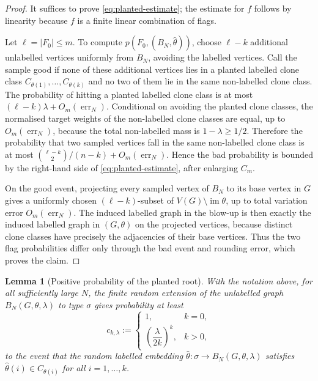 \documentclass[11pt]{article}
\newtheorem{lemma}[theorem]{Lemma}
\theoremstyle{definition}
\begin{document}
\begin{proof}
It suffices to prove \eqref{eq:planted-estimate}; the estimate for $f$ follows
by linearity because $f$ is a finite linear combination of flags.

Let $\ell=|F_0|\le m$.  To compute $p(F_0,(B_N,\widehat\theta))$, choose
$\ell-k$ additional unlabelled vertices uniformly from $B_N$, avoiding the
labelled vertices.  Call the sample good if none of these additional vertices
lies in a planted labelled clone class $C_{\theta(1)},\ldots,C_{\theta(k)}$ and
no two of them lie in the same non-labelled clone class.  The probability of
hitting a planted labelled clone class is at most
$(\ell-k)\lambda+O_m(\operatorname{err}_N)$.  Conditional on avoiding the planted clone classes, the normalised target weights
of the non-labelled clone classes are equal, up to $O_m(\operatorname{err}_N)$,
because the total non-labelled mass is $1-\lambda\ge1/2$.  Therefore the
probability that two sampled vertices
fall in the same non-labelled clone class is at most
$\binom{\ell-k}{2}/(n-k)+O_m(\operatorname{err}_N)$.  Hence the bad probability is
bounded by the right-hand side of \eqref{eq:planted-estimate}, after enlarging
$C_m$.

On the good event, projecting every sampled vertex of $B_N$ to its base vertex
in $G$ gives a uniformly chosen $(\ell-k)$-subset of
$V(G)\setminus\operatorname{im}\theta$, up to total variation error
$O_m(\operatorname{err}_N)$.  The induced labelled graph in the blow-up is then
exactly the induced labelled graph in $(G,\theta)$ on the projected vertices,
because distinct clone classes have precisely the adjacencies of their base
vertices.  Thus the two flag probabilities differ only through the bad event and
rounding error, which proves the claim.
\end{proof}

\begin{lemma}[Positive probability of the planted root]\label{lem:planted-mass}
With the notation above, for all sufficiently large $N$, the finite random
extension of the unlabelled graph $B_N(G,\theta,\lambda)$ to type $\sigma$ gives
probability at least
\[
  c_{k,\lambda}:=
  \begin{cases}
    1, & k=0,\\[1mm]
    \left(\dfrac{\lambda}{2k}\right)^k, & k>0,
  \end{cases}
\]
to the event that the random labelled embedding
$\widehat\theta:\sigma\to B_N(G,\theta,\lambda)$ satisfies
$\widehat\theta(i)\in C_{\theta(i)}$ for all $i=1,\ldots,k$.
\end{lemma}
\end{document}
